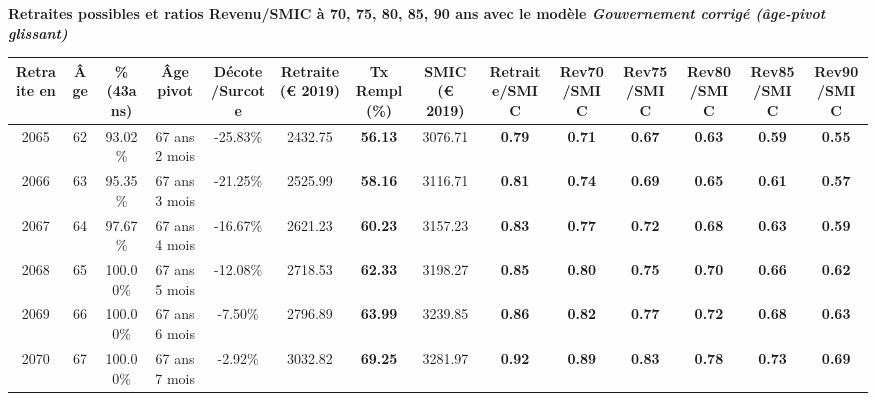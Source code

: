  \vspace{0.1cm} 
{\bf \noindent Retraites possibles et ratios Revenu/SMIC à 70, 75, 80, 85, 90 ans avec le modèle \emph{Gouvernement corrigé (âge-pivot glissant)}}  
 
\begin{adjustbox}{max width=\textwidth} 
\begin{tabular}[htb]{|c|c||c|c|c||c|c||c||c|c|c|c|c|c|} 
\hline 
 Retraite en &  Âge &  \%(43ans) &  Âge pivot &  Décote/Surcote &  Retraite (\euro{} 2019) &  Tx Rempl(\%) &  SMIC (\euro{} 2019) &  Retraite/SMIC &  Rev70/SMIC &  Rev75/SMIC &  Rev80/SMIC &  Rev85/SMIC &  Rev90/SMIC \\ 
\hline \hline 
 2065 &  62 &  93.02\% &  67 ans 2 mois &  -25.83\% &  2432.75 &  {\bf 56.13} &  3076.71 &  {\bf {\color{red} 0.79}} &  {\bf {\color{red} 0.71}} &  {\bf {\color{red} 0.67}} &  {\bf {\color{red} 0.63}} &  {\bf {\color{red} 0.59}} &  {\bf {\color{red} 0.55}} \\ 
\hline 
 2066 &  63 &  95.35\% &  67 ans 3 mois &  -21.25\% &  2525.99 &  {\bf 58.16} &  3116.71 &  {\bf {\color{red} 0.81}} &  {\bf {\color{red} 0.74}} &  {\bf {\color{red} 0.69}} &  {\bf {\color{red} 0.65}} &  {\bf {\color{red} 0.61}} &  {\bf {\color{red} 0.57}} \\ 
\hline 
 2067 &  64 &  97.67\% &  67 ans 4 mois &  -16.67\% &  2621.23 &  {\bf 60.23} &  3157.23 &  {\bf {\color{red} 0.83}} &  {\bf {\color{red} 0.77}} &  {\bf {\color{red} 0.72}} &  {\bf {\color{red} 0.68}} &  {\bf {\color{red} 0.63}} &  {\bf {\color{red} 0.59}} \\ 
\hline 
 2068 &  65 &  100.00\% &  67 ans 5 mois &  -12.08\% &  2718.53 &  {\bf 62.33} &  3198.27 &  {\bf {\color{red} 0.85}} &  {\bf {\color{red} 0.80}} &  {\bf {\color{red} 0.75}} &  {\bf {\color{red} 0.70}} &  {\bf {\color{red} 0.66}} &  {\bf {\color{red} 0.62}} \\ 
\hline 
 2069 &  66 &  100.00\% &  67 ans 6 mois &  -7.50\% &  2796.89 &  {\bf 63.99} &  3239.85 &  {\bf {\color{red} 0.86}} &  {\bf {\color{red} 0.82}} &  {\bf {\color{red} 0.77}} &  {\bf {\color{red} 0.72}} &  {\bf {\color{red} 0.68}} &  {\bf {\color{red} 0.63}} \\ 
\hline 
 2070 &  67 &  100.00\% &  67 ans 7 mois &  -2.92\% &  3032.82 &  {\bf 69.25} &  3281.97 &  {\bf {\color{red} 0.92}} &  {\bf {\color{red} 0.89}} &  {\bf {\color{red} 0.83}} &  {\bf {\color{red} 0.78}} &  {\bf {\color{red} 0.73}} &  {\bf {\color{red} 0.69}} \\ 
\hline 
\hline 
\end{tabular} 
\end{adjustbox} 
 
